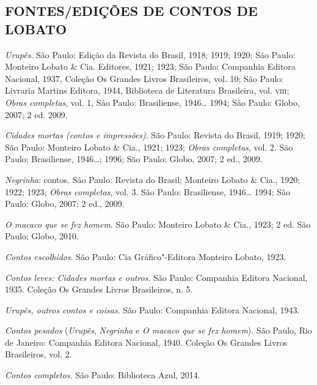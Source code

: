 \subsection{FONTES/EDIÇÕES DE CONTOS DE LOBATO}

\emph{Urupês}. São Paulo: Edição da Revista do Brasil, 1918; 1919; 1920;
São Paulo: Monteiro Lobato \& Cia. Editores, 1921; 1923; São Paulo:
Companhia Editora Nacional, 1937, Coleção Os Grandes Livros Brasileiros,
vol. 10; São Paulo: Livraria Martins Editora, 1944, Biblioteca de
Literatura Brasileira, vol. \textsc{viii}; \emph{Obras completas}, vol. 1, São
Paulo: Brasiliense, 1946\ldots{} 1994; São Paulo: Globo, 2007; 2 ed.
2009.

\emph{Cidades mortas (contos e impressões)}. São Paulo: Revista do
Brasil, 1919; 1920; São Paulo: Monteiro Lobato \& Cia., 1921; 1923;
\emph{Obras completas}, vol. 2. São Paulo: Brasiliense, 1946\ldots{};
1996; São Paulo: Globo, 2007; 2 ed., 2009.

\emph{Negrinha}: contos. São Paulo: Revista do Brasil; Monteiro Lobato
\& Cia., 1920; 1922; 1923; \emph{Obras completas}, vol. 3. São Paulo:
Brasiliense, 1946\ldots{} 1994; São Paulo: Globo, 2007; 2 ed., 2009.

\emph{O macaco que se fez homem}. São Paulo: Monteiro Lobato \& Cia.,
1923; 2 ed. São Paulo: Globo, 2010.

\emph{Contos escolhidos}. São Paulo: Cia Gráfico"-Editora Monteiro Lobato, 1923.

\emph{Contos leves: Cidades mortas e outros}. São Paulo: Companhia
Editora Nacional, 1935. Coleção Os Grandes Livros Brasileiros, n. 5.

\emph{Urupês, outros contos e coisas}. São Paulo: Companhia Editora
Nacional, 1943.

\emph{Contos pesados} (\emph{Urupês}, \emph{Negrinha} e \emph{O macaco
que se fez homem}). São Paulo, Rio de Janeiro: Companhia Editora Nacional, 1940.
Coleção Os Grandes Livros Brasileiros, vol. 2.

\emph{Contos completos}. São Paulo: Biblioteca Azul, 2014.



